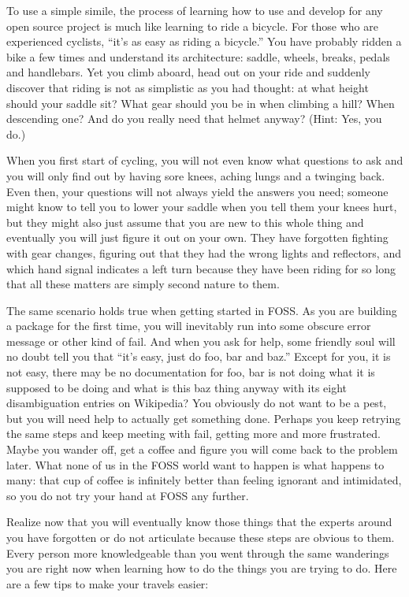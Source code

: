 To use a simple simile, the process of learning how to use and develop for any open source project is much like learning to ride a bicycle. For those who are experienced cyclists, ``it’s as easy as riding a bicycle.'' You have probably ridden a bike a few times and understand its architecture: saddle, wheels, breaks, pedals and handlebars. Yet you climb aboard, head out on your ride and suddenly discover that riding is not as simplistic as you had thought: at what height should your saddle sit? What gear should you be in when climbing a hill? When descending one? And do you really need that helmet anyway? (Hint: Yes, you do.) 

When you first start of cycling, you will not even know what questions to ask and you will only find out by having sore knees, aching lungs and a twinging back. Even then, your questions will not always yield the answers you need; someone might know to tell you to lower your saddle when you tell them your knees hurt, but they might also just assume that you are new to this whole thing and eventually you will just figure it out on your own. They have forgotten fighting with gear changes, figuring out that they had the wrong lights and reflectors, and which hand signal indicates a left turn because they have been riding for so long that all these matters are simply second nature to them.

The same scenario holds true when getting started in FOSS. As you are building a package for the first time, you will inevitably run into some obscure error message or other kind of fail. And when you ask for help, some friendly soul will no doubt tell you that ``it’s easy, just do foo, bar and baz.'' Except for you, it is not easy, there may be no documentation for foo, bar is not doing what it is supposed to be doing and what is this baz thing anyway with its eight disambiguation entries on Wikipedia? You obviously do not want to be a pest, but you will need help to actually get something done. Perhaps you keep retrying the same steps and keep meeting with fail, getting more and more frustrated. Maybe you wander off, get a coffee and figure you will come back to the problem later. What none of us in the FOSS world want to happen is what happens to many: that cup of coffee is infinitely better than feeling ignorant and intimidated, so you do not try your hand at FOSS any further.

Realize now that you will eventually know those things that the experts around you have forgotten or do not articulate because these steps are obvious to them. Every person more knowledgeable than you went through the same wanderings you are right now when learning how to do the things you are trying to do. Here are a few tips to make your travels easier:


